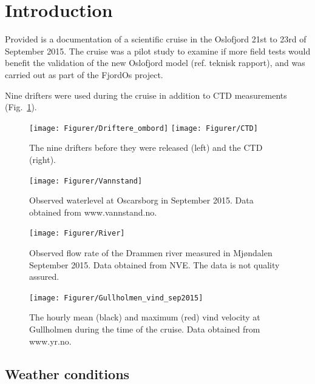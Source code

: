 \documentclass[12pt,a4paper,english]{article}
\begin{document}
\clearpage
\tableofcontents

\clearpage

\section{Introduction}
Provided is a documentation of a scientific cruise in the Oslofjord 21st to 23rd of September 2015. The cruise was a pilot study to examine if more field tests would benefit the validation of the new Oslofjord model (ref. teknisk rapport), and was carried out as part of the FjordOs project.


Nine drifters were used during the cruise in addition to CTD measurements (Fig.~\ref{fig:Utstyr}). %

\begin{figure}[b]
\centerline{
\texttt{[image: Figurer/Driftere\_ombord]}
\texttt{[image: Figurer/CTD]}
}
\caption{\small
The nine drifters before they were released (left) and the CTD (right).}
\label{fig:Utstyr}
\end{figure}

\begin{figure}[tb]
\centerline{
\texttt{[image: Figurer/Vannstand]}}
\caption{\small
Observed waterlevel at Oscarsborg in September 2015. Data obtained from www.vannstand.no.}
\label{fig:Waterlevel}
\end{figure}

\begin{figure}[tb]
\centerline{
\texttt{[image: Figurer/River]}}
\caption{\small
Observed flow rate of the Drammen river measured in Mj\o ndalen September 2015. Data obtained from NVE. The data is not quality assured.}
\label{fig:River}
\end{figure}

\begin{figure}[tb]
\centerline{
\texttt{[image: Figurer/Gullholmen\_vind\_sep2015]}}
\caption{\small
The hourly mean (black) and maximum (red) vind velocity at Gullholmen during the time of the cruise. Data obtained from www.yr.no.}
\label{fig:Wind}
\end{figure}


\subsection{Weather conditions}
\end{document}

